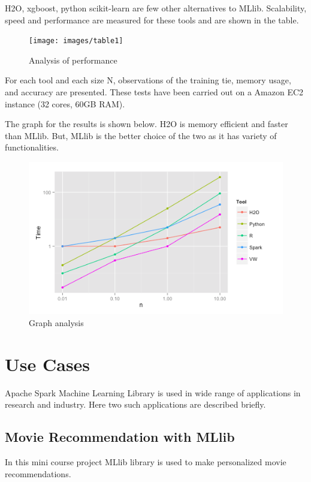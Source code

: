 \documentclass[9pt,twocolumn,twoside]{../../styles/osajnl}
\begin{document}
H2O\cite{www-H2O}, xgboost\cite{www-xgboost}, python
scikit-learn\cite{www-scikitlearn} are few other alternatives to
MLlib. Scalability, speed and performance are measured for these tools
and are shown in the table.

\begin{figure}[htbp]
\begin{center}
\centering
\texttt{[image: images/table1]}
\caption{Analysis of performance}
\label{fig:false-color}
\end{center}
\end{figure}

For each tool and each size N, observations of the training tie,
memory usage, and accuracy are presented. These tests have been
carried out on a Amazon EC2 instance (32 cores, 60GB
RAM)\cite{Analysis-webpage}.

The graph for the results is shown below. H2O is memory efficient and
faster than MLlib. But, MLlib is the better choice of the two as it has
variety of functionalities.

\begin{figure}[htbp]
\begin{center}
\centering
\includegraphics[width=\linewidth]{images/analysisgraph}
\caption{Graph analysis}
\label{fig:false-color}
\end{center}
\end{figure}

\section{Use Cases}
Apache Spark Machine Learning Library is used in wide range of
applications in research and industry. Here two such applications are
described briefly.

\subsection{Movie Recommendation with MLlib}
In this mini course project MLlib library is used to make personalized
movie recommendations.\cite{MovieRecommender}
\end{document}
